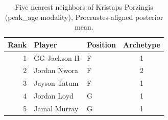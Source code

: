 \begin{table}[htbp]
  \centering\small
  \begin{tabular}{rllc}
    \toprule
    Rank & Player & Position & Archetype \\
    \midrule
    1 & GG Jackson II & F & 1 \\
    2 & Jordan Nwora & F & 2 \\
    3 & Jayson Tatum & F & 1 \\
    4 & Jordan Loyd & G & 1 \\
    5 & Jamal Murray & G & 1 \\
    \bottomrule
  \end{tabular}
  \caption{Five nearest neighbors of Kristaps Porzingis (peak_age modality), Procrustes-aligned posterior mean.}
  \label{tab:Kristaps_Porzingis_neighbors_peak_age}
\end{table}

